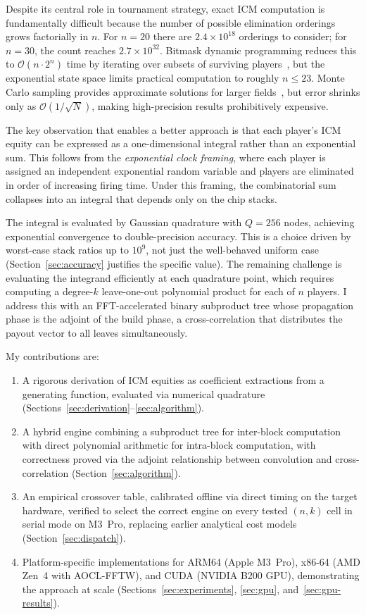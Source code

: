 \documentclass[11pt]{article}
\newcommand{\bigO}{\mathcal{O}}
\begin{document}
Despite its central role in tournament strategy, exact ICM computation
is fundamentally difficult because the number of possible elimination
orderings grows factorially in $n$. For $n = 20$ there are $2.4 \times
10^{18}$ orderings to consider; for $n = 30$, the count reaches
$2.7 \times 10^{32}$. Bitmask dynamic programming reduces this to
$\bigO(n \cdot 2^n)$ time by iterating over subsets of surviving
players~\citep{malmuth1987}, but the exponential state space limits
practical computation to roughly $n \leq 23$. Monte Carlo sampling
provides approximate solutions for larger fields~\citep{icmizer2024},
but error shrinks only as $\bigO(1/\sqrt{N})$, making high-precision
results prohibitively expensive.

The key observation that enables a better approach is that each player's
ICM equity can be expressed as a one-dimensional integral rather than an
exponential sum. This follows from the \emph{exponential clock framing},
where each player is assigned an independent exponential random variable
and players are eliminated in order of increasing firing time. Under
this framing, the combinatorial sum collapses into an integral that
depends only on the chip stacks.

The integral is evaluated by Gaussian quadrature with $Q = 256$ nodes,
achieving exponential convergence to double-precision accuracy. This is a
choice driven by worst-case stack ratios up to $10^9$, not just the
well-behaved uniform case (Section~\ref{sec:accuracy} justifies the
specific value).
The remaining challenge is evaluating the integrand efficiently at each
quadrature point, which requires computing a degree-$k$ leave-one-out
polynomial product for each of $n$ players. I address this with an
FFT-accelerated binary subproduct tree whose propagation phase is the
adjoint of the build phase, a cross-correlation that distributes the
payout vector to all leaves simultaneously.

My contributions are:
\begin{enumerate}
  \item A rigorous derivation of ICM equities as coefficient extractions
    from a generating function, evaluated via numerical quadrature
    (Sections~\ref{sec:derivation}--\ref{sec:algorithm}).
  \item A hybrid engine combining a subproduct tree for inter-block
    computation with direct polynomial arithmetic for intra-block
    computation, with correctness proved via the adjoint relationship
    between convolution and cross-correlation (Section~\ref{sec:algorithm}).
  \item An empirical crossover table, calibrated offline via direct
    timing on the target hardware, verified to select the correct
    engine on every tested $(n,k)$ cell in serial mode on M3~Pro,
    replacing earlier analytical cost models (Section~\ref{sec:dispatch}).
  \item Platform-specific implementations for ARM64 (Apple M3~Pro),
    x86-64 (AMD Zen~4 with AOCL-FFTW), and CUDA (NVIDIA B200 GPU),
    demonstrating the approach at scale (Sections~\ref{sec:experiments},
    \ref{sec:gpu}, and~\ref{sec:gpu-results}).
\end{enumerate}
\end{document}
